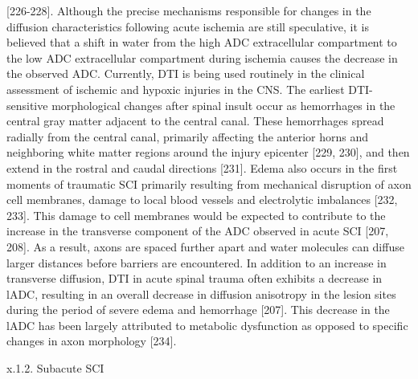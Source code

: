[226-228].  Although the precise mechanisms responsible for changes in the diffusion characteristics following acute ischemia are still speculative, it is believed that a shift in water from the high ADC extracellular compartment to the low ADC extracellular compartment during ischemia causes the decrease in the observed ADC.  Currently, DTI is being used routinely in the clinical assessment of ischemic and hypoxic injuries in the CNS.  The earliest DTI-sensitive morphological changes after spinal insult occur as hemorrhages in the central gray matter adjacent to the central canal.  These hemorrhages spread radially from the central canal, primarily affecting the anterior horns and neighboring white matter regions around the injury epicenter [229, 230], and then extend in the rostral and caudal directions [231].  Edema also occurs in the first moments of traumatic SCI primarily resulting from mechanical disruption of axon cell membranes, damage to local blood vessels and electrolytic imbalances [232, 233].  This damage to cell membranes would be expected to contribute to the increase in the transverse component of the ADC observed in acute SCI [207, 208]. As a result, axons are spaced further apart and water molecules can diffuse larger distances before barriers are encountered. In addition to an increase in transverse diffusion, DTI in acute spinal trauma often exhibits a decrease in lADC, resulting in an overall decrease in diffusion anisotropy in the lesion sites during the period of severe edema and hemorrhage [207].  This decrease in the lADC has been largely attributed to metabolic dysfunction as opposed to specific changes in axon morphology [234]. 

x.1.2. Subacute SCI

